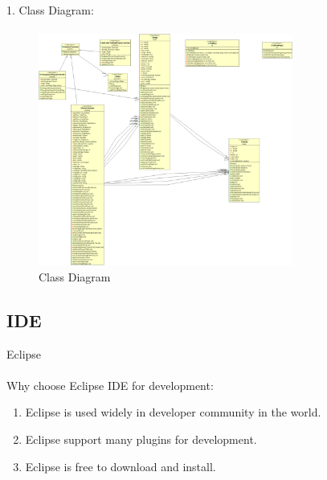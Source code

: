 \documentclass[a4paper,10pt]{article}
\begin{document}
1. Class Diagram:
\paragraph{}
\begin{figure}[H]
		\centering
		\includegraphics[height = 3in]{class_diagram.png}
		\caption[Optional caption]{Class Diagram}
		\label{fig:Repository}
	\end{figure}
\paragraph{}

\subsection{IDE} 

Eclipse
\paragraph{}
Why choose Eclipse IDE for development:
\begin{enumerate}
	\item Eclipse is used widely in developer community in the world.
	\item Eclipse support many plugins for development.
	\item Eclipse is free to download and install.
\end{enumerate}
\end{document}
